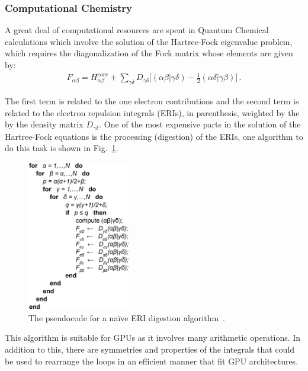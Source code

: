 \subsubsection{Computational Chemistry}


\par
A great deal of computational resources are spent in Quantum Chemical calculations which involve the solution of the Hartree-Fock eigenvalue problem, which requires the diagonalization of the Fock matrix whose elements are given by:
\begin{eqnarray}\label{eq:hf_equation}
F_{\alpha\beta} = H_{\alpha\beta}^{core} + \sum_{\gamma\delta}D_{\gamma\delta}\Big[(\alpha\beta|\gamma\delta)-\frac{1}{2}(\alpha\delta|\gamma\beta)\Big] \,.
\end{eqnarray}


\par
The first term is related to the one electron contributions and the second term is related to the electron repulsion integrals (ERIs), in parenthesis, weighted by the by the density matrix $D_{\gamma\delta}$.
One of the most expensive parts in the solution of the Hartree-Fock equations is the processing (digestion) of the ERIs, one algorithm to do this task is shown in Fig.~\ref{fig:hf_algorithm}.


\begin{figure}[!h]
\centering\includegraphics[width=0.4\textwidth]{fig_problem/hartree_fock_algorithms.png}
\caption{The pseudocode for a na\"ive ERI digestion algorithm~\cite{barca2021faster}.}\label{fig:hf_algorithm}
\end{figure}


\par
This algorithm is suitable for GPUs as it involves many arithmetic operations.
In addition to this, there are symmetries and properties of the integrals that could be used to rearrange the loops in an efficient manner that fit GPU architectures.


